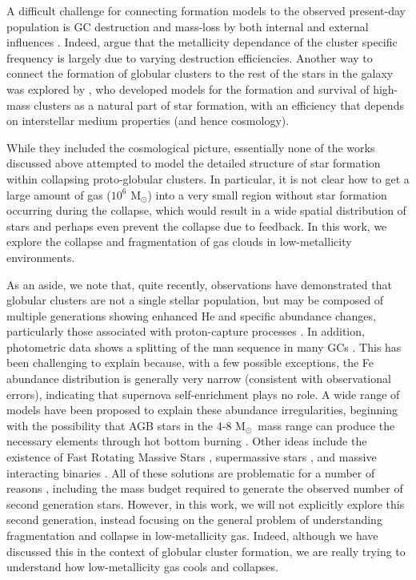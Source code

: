 \documentclass[useAMS,usenatbib]{mn2e}
\newcommand{\msun}{{M$_\odot$}}
\begin{document}
A difficult challenge for connecting formation models to the observed present-day population is GC destruction and mass-loss by both internal and external influences \citep{Fujii2007, Kruijssen2012}.  Indeed, \citet{Lamers2017} argue that the metallicity dependance of the cluster specific frequency is largely due to varying destruction efficiencies.  Another way to connect the formation of globular clusters to the rest of the stars in the galaxy was explored by \citet{Kruijssen2015}, who developed models for the formation and survival of high-mass clusters as a natural part of star formation, with an efficiency that depends on interstellar medium properties (and hence cosmology).

While they included the cosmological picture, essentially none of the works discussed above attempted to model the detailed structure of star formation within collapsing proto-globular clusters.  In particular, it is not clear how to get a large amount of gas ($10^6$ \msun) into a very small region without star formation occurring during the collapse, which would result in a wide spatial distribution of stars and perhaps even prevent the collapse due to feedback.  In this work, we explore the collapse and fragmentation of gas clouds in low-metallicity environments.

As an aside, we note that, quite recently, observations have demonstrated that globular clusters are not a single stellar population, but may be composed of multiple generations showing enhanced He and specific abundance changes, particularly those associated with proton-capture processes \citep[e.g.,][]{Norris1981, Kraft1994, Gratton2001, Carretta2009}.  In addition, photometric data shows a splitting of the man sequence in many GCs \citet[e.g.,][]{Piotto2009, Anderson2009, Milone2010}.  This has been challenging to explain because, with a few possible exceptions, the Fe abundance distribution is generally very narrow (consistent with observational errors), indicating that supernova self-enrichment plays no role.  A wide range of models have been proposed to explain these abundance irregularities, beginning with the possibility that AGB stars in the 4-8 \msun\ mass range can produce the necessary elements through hot bottom burning \citep[e.g.,][]{DErcole2010, Ventura2013}.  Other ideas include the existence of Fast Rotating Massive Stars \citep[FRMS][]{Krause2013}, supermassive stars \citep{Denissenkov2014,  Denissenkov2015}, and massive interacting binaries \citep[e.g.,][]{deMink2009, Bastian2013}.  All of these solutions are problematic for a number of reasons \citep[e.g.,][]{Renzini2015, Bastian2015}, including the mass budget required to generate the observed number of second generation stars.  However, in this work, we will not explicitly explore this second generation, instead focusing on the general problem of understanding fragmentation and collapse in low-metallicity gas. Indeed, although we have discussed this in the context of globular cluster formation, we are really trying to understand how low-metallicity gas cools and collapses.
\end{document}
